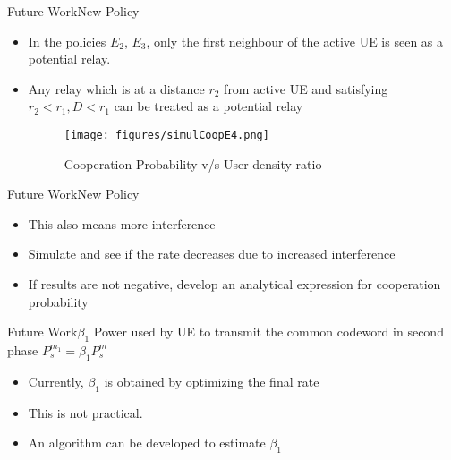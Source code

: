 \documentclass{beamer}
\begin{document}
\begin{frame}{Future Work}{New Policy}
  \begin{itemize}
  \item
     In the policies $E_2$, $E_3$, only the first neighbour of the active UE is seen as a potential relay. 
    
   \item Any relay which is at a distance $r_2$ from active UE and satisfying $r_2<r_1, D < r_1$ can be treated as a potential relay
   \begin{figure}[!h]
        \texttt{[image: figures/simulCoopE4.png]}
        \centering
        \vspace{-2mm}
        \caption{Cooperation Probability v/s User density ratio}
        \label{plot3}
    \end{figure}    
 \end{itemize}   

\end{frame}

\begin{frame}{Future Work}{New Policy}
\vspace{0.75cm}
\begin{itemize}  
  \item
   This also means more interference
   \vspace{0.75cm}
  \item Simulate and see if the rate decreases due to increased interference
  \vspace{0.75cm}
  \item If results are not negative, develop an analytical expression for cooperation probability
  \end{itemize}
\end{frame}

\begin{frame}{Future Work}{$\beta_1$}
Power used by UE to transmit the common codeword in second phase $P_s^{m_1} = \beta_1 P_s^m$
\begin{itemize}  
  \item
   Currently, $\beta_1$ is obtained by optimizing the final rate
   \vspace{1cm}
   \pause
  \item This is not practical. 
  \pause
  \vspace{1cm}
  \item An algorithm can be developed to estimate $\beta_1$  
  \end{itemize}
\end{frame}
\end{document}
